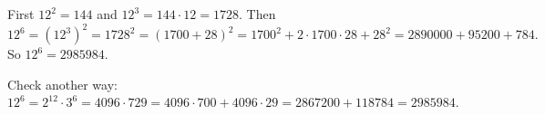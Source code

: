 First $12^2=144$ and $12^3=144\cdot12=1728$. Then
\[
12^6=\left(12^3\right)^2=1728^2=(1700+28)^2=1700^2+2\cdot1700\cdot28+28^2=2890000+95200+784 .
\]
So $12^6=\boxed{2985984}$.

Check another way: $12^6=2^{12}\cdot3^6=4096\cdot729=4096\cdot700+4096\cdot29=2867200+118784=2985984$.
